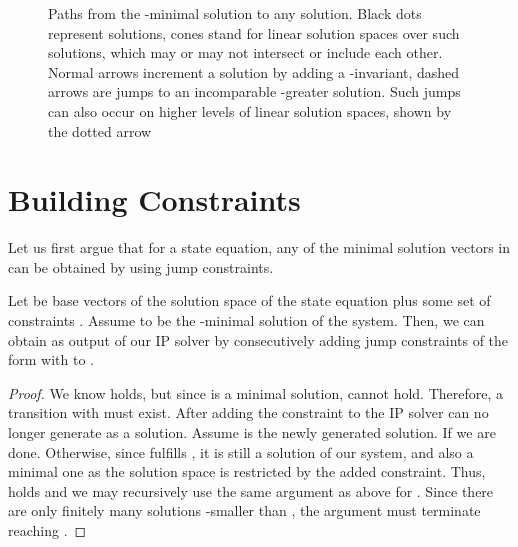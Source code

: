 \documentclass{LMCS}
\begin{document}
\begin{figure}[tb]
\caption{\label{f.solpath}Paths from the -minimal solution  to any solution. Black dots represent solutions, cones
stand for linear solution spaces over such solutions, which may or may not intersect or include each other.
Normal arrows increment a solution by adding a -invariant, dashed arrows are jumps to an incomparable -greater solution.
Such jumps can also occur on higher levels of linear solution spaces, shown by the dotted arrow}
\end{figure}

\section{Building Constraints}\label{sec4}

Let us first argue that for a state equation, any of the minimal solution vectors in  can be obtained by using jump
constraints.

\begin{lem}\label{L.BJ}
Let  be base vectors of the solution space of the state equation  plus some set of constraints . 
Assume  to be the -minimal solution of the system. 
Then, we can obtain  as output of our IP solver by consecutively adding jump constraints of the form  with  to .
\end{lem}
\begin{proof}
We know  holds, but since  is a minimal solution,  cannot hold. Therefore, a transition  with
 must exist. After adding the constraint  to 
the IP solver can no longer generate  as a solution. Assume  is the newly generated solution. If 
we are done. Otherwise, since  fulfills , it is still a solution of our system, and also a minimal one as the
solution space is restricted by the added constraint. Thus,  holds and
we may recursively use the same argument as above for . Since there are only finitely many solutions -smaller
than , the argument must terminate reaching .
\end{proof}
\end{document}
